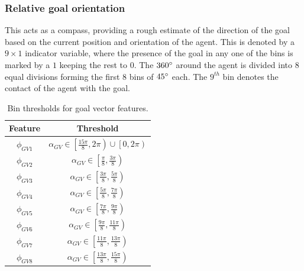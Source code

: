 \subsubsection*{Relative goal orientation} 
This acts as a compass, providing a rough estimate of the direction of the goal based on the current position and orientation of the agent. This is denoted by a $9 \times 1$ indicator variable, where the presence of the goal in any one of the bins is marked by a $1$ keeping the rest to $0$. The $360 \degree$ around the agent is divided into $8$ equal divisions forming the first 8 bins of $45 \degree$ each. The $9^{th}$ bin denotes the contact of the agent with the goal.
\begin{table}[tbhp]
	\label{tab:goal-vector-bins}
	\begin{center}
		 \renewcommand{\arraystretch}{1.3}
		\begin{tabular}{|c|c|}
			\hline
			\textbf{Feature} & \textbf{Threshold} \\
			\hline
			$\phi_{GV1}$ & $\alpha_{GV} \in \left[ \frac{15\pi}{8} , 2\pi \right) \cup \left[ 0, 2\pi \right)$ \\
			
			$\phi_{GV2}$ & $\alpha_{GV} \in \left[ \frac{\pi}{8} , \frac{3\pi}{8} \right)$ \\
			
			$\phi_{GV3}$ & $\alpha_{GV} \in \left[ \frac{3\pi}{8} , \frac{5\pi}{8} \right)$ \\
			
			$\phi_{GV4}$ & $\alpha_{GV} \in \left[ \frac{5\pi}{8} , \frac{7\pi}{8} \right)$ \\
			
			$\phi_{GV5}$ & $\alpha_{GV} \in \left[ \frac{7\pi}{8} , \frac{9\pi}{8} \right)$ \\
			
			$\phi_{GV6}$ & $\alpha_{GV} \in \left[ \frac{9\pi}{8} , \frac{11\pi}{8} \right)$ \\
			
			$\phi_{GV7}$ & $\alpha_{GV} \in \left[ \frac{11\pi}{8} , \frac{13\pi}{8} \right)$ \\
			
			$\phi_{GV8}$ & $\alpha_{GV} \in \left[ \frac{13\pi}{8} , \frac{15\pi}{8} \right)$ \\
			\hline
		\end{tabular}
	\end{center}
	\caption{Bin thresholds for goal vector features.}
\end{table}

